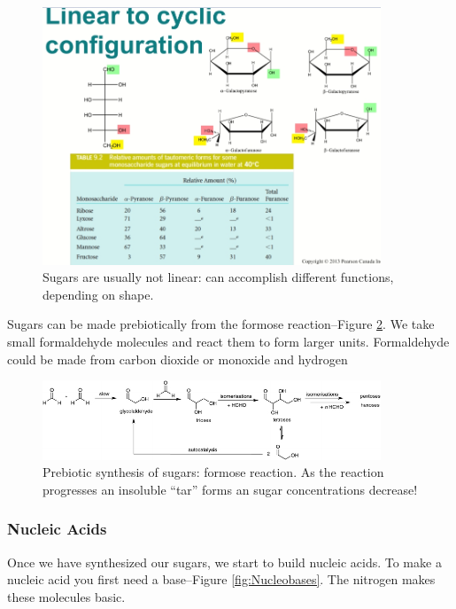 \documentclass[]{article}
\begin{document}
\begin{figure}[H]
	\caption[Sugars can accomplish different functions, depending on shape.]{Sugars are usually not linear: can accomplish different functions, depending on shape.}\label{fig:SugarTautomers} 
	\includegraphics[width=0.9\textwidth]{SugarTautomers}
\end{figure}

Sugars can be made prebiotically from the formose reaction--Figure \ref{fig:SugarsPrebioticSynthesis}. We take small formaldehyde molecules and react them to form larger units. Formaldehyde could be made from carbon dioxide or monoxide and hydrogen

\begin{figure}[H]
	\caption[Prebiotic synthesis of sugars: formose reaction]{Prebiotic synthesis of sugars: formose reaction. As the reaction progresses an insoluble “tar” forms an sugar concentrations decrease!}\label{fig:SugarsPrebioticSynthesis} 
	\includegraphics[width=0.9\textwidth]{SugarsPrebioticSynthesis}
\end{figure}


\subsubsection{Nucleic Acids}

Once we have synthesized our sugars, we start to build nucleic acids. To make a nucleic acid you first need a base--Figure \ref{fig:Nucleobases}. The nitrogen makes these molecules basic.
\end{document}
